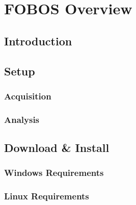 \chapter{FOBOS Overview}

    \section{Introduction}
    \section{Setup}
        \subsection{Acquisition}
        \subsection{Analysis}
    \section{Download \& Install}
        \subsection{Windows Requirements}
        \subsection{Linux Requirements}
        \clearpage
